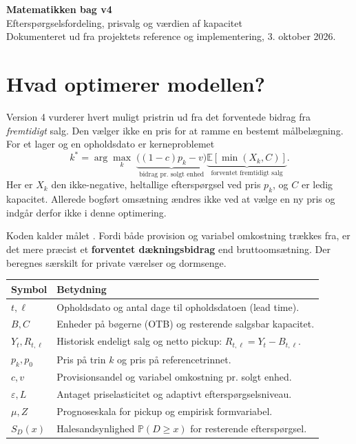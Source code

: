 \documentclass[11pt,a4paper]{article}
\newcommand{\E}{\mathbb E}\newcommand{\Prob}{\mathbb P}
\newcommand{\code}[1]{\texttt{\small\detokenize{#1}}}
\begin{document}
{\Huge\bfseries\textcolor{ink}{Matematikken bag v4}}\\[7pt]
{\large Efterspørgselsfordeling, prisvalg og værdien af kapacitet}\\[5pt]
{\small Dokumenteret ud fra projektets reference og implementering, 3. oktober 2026.}

\section{Hvad optimerer modellen?}
Version 4 vurderer hvert muligt pristrin ud fra det forventede bidrag fra
\emph{fremtidigt} salg. Den vælger ikke en pris for at ramme en bestemt
målbelægning. For et lager og en opholdsdato er kerneproblemet
\begin{equation}\boxed{\quad k^*=\arg\max_k\;\underbrace{\bigl((1-c)p_k-v\bigr)}_{\text{bidrag pr. solgt enhed}}
\underbrace{\E[\min(X_k,C)]}_{\text{forventet fremtidigt salg}}.\quad}\label{eq:objective}\end{equation}
Her er $X_k$ den ikke-negative, heltallige efterspørgsel ved pris $p_k$, og $C$
er ledig kapacitet. Allerede bogført omsætning ændres ikke ved at vælge en ny pris
og indgår derfor ikke i denne optimering.

Koden kalder målet \code{expected_revenue}. Fordi både provision og variabel
omkostning trækkes fra, er det mere præcist et \textbf{forventet dækningsbidrag}
end bruttoomsætning. Der beregnes særskilt for private værelser og dormsenge.

\begin{center}\small
\begin{tabular}{@{}p{24mm}p{119mm}@{}}\toprule
Symbol & Betydning \\\midrule
$t,\ell$ & Opholdsdato og antal dage til opholdsdatoen (lead time).\\
$B,C$ & Enheder på bøgerne (OTB) og resterende salgsbar kapacitet.\\
$Y_t,R_{t,\ell}$ & Historisk endeligt salg og netto pickup: $R_{t,\ell}=Y_t-B_{t,\ell}$.\\
$p_k,p_0$ & Pris på trin $k$ og pris på referencetrinnet.\\
$c,v$ & Provisionsandel og variabel omkostning pr. solgt enhed.\\
$\varepsilon,L$ & Antaget priselasticitet og adaptivt efterspørgselsniveau.\\
$\mu,Z$ & Prognoseskala for pickup og empirisk formvariabel.\\
$S_D(x)$ & Halesandsynlighed $\Prob(D\geq x)$ for resterende efterspørgsel.\\\bottomrule
\end{tabular}
\end{center}
\end{document}
